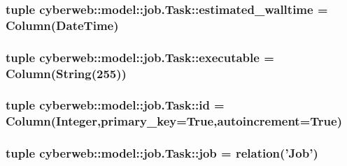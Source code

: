 \hypertarget{classcyberweb_1_1model_1_1job_1_1_task_a5a4e64f343d52a75aebf834e64d3175f}{
\subsubsection[{estimated\-\_\-walltime}]{\setlength{\rightskip}{0pt plus 5cm}tuple {\bf cyberweb\-::model\-::job.\-Task\-::estimated\-\_\-walltime} = \-Column(\-Date\-Time)}}\label{classcyberweb_1_1model_1_1job_1_1_task_a5a4e64f343d52a75aebf834e64d3175f}
\hypertarget{classcyberweb_1_1model_1_1job_1_1_task_a236e10d3584df4bbe475f3922ab7b5e9}{
\subsubsection[{executable}]{\setlength{\rightskip}{0pt plus 5cm}tuple {\bf cyberweb\-::model\-::job.\-Task\-::executable} = \-Column(\-String(255))}}\label{classcyberweb_1_1model_1_1job_1_1_task_a236e10d3584df4bbe475f3922ab7b5e9}
\hypertarget{classcyberweb_1_1model_1_1job_1_1_task_a6b2bee4f07e3bd54f17d405471728be3}{
\subsubsection[{id}]{\setlength{\rightskip}{0pt plus 5cm}tuple {\bf cyberweb\-::model\-::job.\-Task\-::id} = \-Column(\-Integer,primary\-\_\-key=\-True,autoincrement=\-True)}}\label{classcyberweb_1_1model_1_1job_1_1_task_a6b2bee4f07e3bd54f17d405471728be3}
\hypertarget{classcyberweb_1_1model_1_1job_1_1_task_a270b9b25e247a30f473c0149488c511a}{
\subsubsection[{job}]{\setlength{\rightskip}{0pt plus 5cm}tuple {\bf cyberweb\-::model\-::job.\-Task\-::job} = relation('{\bf \-Job}')}}\label{classcyberweb_1_1model_1_1job_1_1_task_a270b9b25e247a30f473c0149488c511a}

